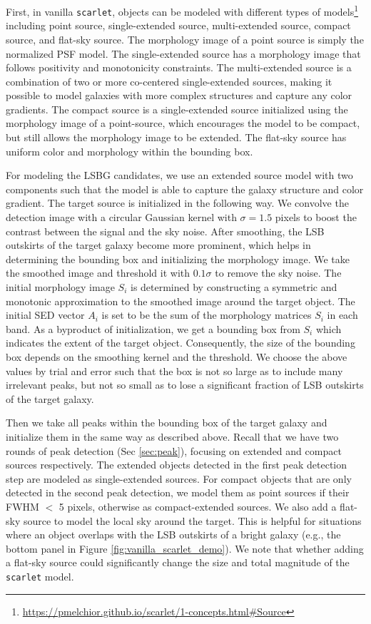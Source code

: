 \documentclass[twocolumn,astrosymb,twocolappendix,linenumbers]{aastex631}
\newcommand{\code}[1]{\texttt{#1}}
\begin{document}
\begin{CJK*}{UTF8}{gbsn}
First, in vanilla \code{scarlet}, objects can be modeled with different types of models\footnote{\url{https://pmelchior.github.io/scarlet/1-concepts.html\#Source}} including point source, single-extended source, multi-extended source, compact source, and flat-sky source. The morphology image of a point source is simply the normalized PSF model. The single-extended source has a morphology image that follows positivity and monotonicity constraints. The multi-extended source is a combination of two or more co-centered single-extended sources, making it possible to model galaxies with more complex structures and capture any color gradients. The compact source is a single-extended source initialized using the morphology image of a point-source, which encourages the model to be compact, but still allows the morphology image to be extended. The flat-sky source has uniform color and morphology within the bounding box.

For modeling the LSBG candidates, we use an extended source model with two components such that the model is able to capture the galaxy structure and color gradient. The target source is initialized in the following way. We convolve the detection image with a circular Gaussian kernel with $\sigma=1.5$ pixels to boost the contrast between the signal and the sky noise. After smoothing, the LSB outskirts of the target galaxy become more prominent, which helps in determining the bounding box and initializing the morphology image. We take the smoothed image and threshold it with $0.1\sigma$ to remove the sky noise. The initial morphology image $S_i$ is determined by constructing a symmetric and monotonic approximation to the smoothed image around the target object. The initial SED vector $A_i$ is set to be the sum of the morphology matrices $S_i$ in each band. As a byproduct of initialization, we get a bounding box from $S_i$ which indicates the extent of the target object. Consequently, the size of the bounding box depends on the smoothing kernel and the threshold. We choose the above values by trial and error such that the box is not so large as to include many irrelevant peaks, but not so small as to lose a significant fraction of LSB outskirts of the target galaxy. 

Then we take all peaks within the bounding box of the target galaxy and initialize them in the same way as described above. Recall that we have two rounds of peak detection (Sec \ref{sec:peak}), focusing on extended and compact sources respectively. The extended objects detected in the first peak detection step are modeled as single-extended sources. For compact objects that are only detected in the second peak detection, we model them as point sources if their FWHM $<$ 5 pixels, otherwise as compact-extended sources. We also add a flat-sky source to model the local sky around the target. This is helpful for situations where an object overlaps with the LSB outskirts of a bright galaxy (e.g., the bottom panel in Figure \ref{fig:vanilla_scarlet_demo}). We note that whether adding a flat-sky source could significantly change the size and total magnitude of the \code{scarlet} model.


\end{CJK*}
\end{document}
